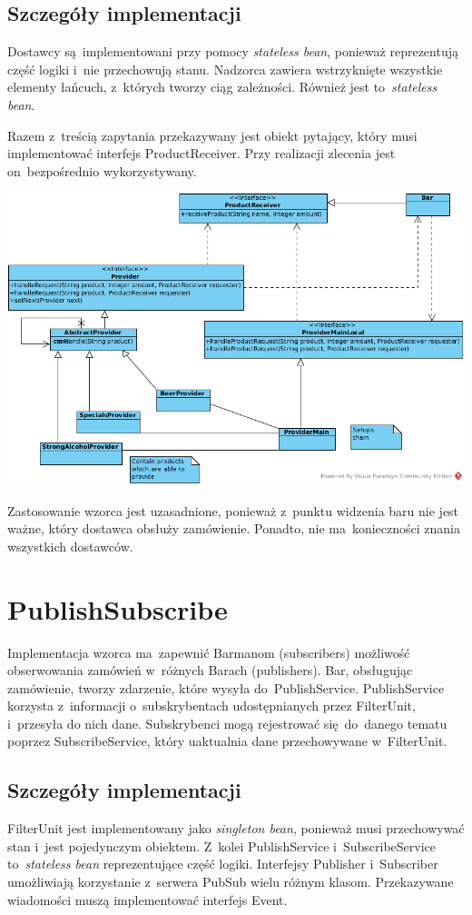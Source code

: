 \documentclass[11pt]{aghdpl}
\begin{document}
\subsection{Szczegóły implementacji}
Dostawcy są~implementowani przy pomocy \textit{stateless bean}, ponieważ reprezentują część logiki i~nie przechowują stanu. Nadzorca zawiera wstrzyknięte wszystkie elementy łańcuch, z~których tworzy ciąg zależności. Również jest to~\textit{stateless bean}.

Razem z~treścią zapytania przekazywany jest obiekt pytający, który musi implementować interfejs ProductReceiver. Przy realizacji zlecenia jest on~bezpośrednio wykorzystywany.
\begin{center}
 \includegraphics[width=16cm]{chain}
\end{center}

Zastosowanie wzorca jest uzasadnione, ponieważ z~punktu widzenia baru nie jest ważne, który dostawca obsłuży zamówienie. Ponadto, nie ma~konieczności znania wszystkich dostawców.

\section{PublishSubscribe}
Implementacja wzorca ma~zapewnić Barmanom (subscribers) możliwość obserwowania zamówień w~różnych Barach (publishers). Bar, obsługując zamówienie, tworzy zdarzenie, które wysyła do~PublishService. PublishService korzysta z~informacji o~subskrybentach udostępnianych przez FilterUnit, i~przesyła do nich dane. Subskrybenci mogą rejestrować się~do~danego tematu poprzez SubscribeService, który uaktualnia dane przechowywane w~FilterUnit.

\subsection{Szczegóły implementacji}
FilterUnit jest implementowany jako \textit{singleton bean}, ponieważ musi przechowywać stan i~jest pojedynczym obiektem. Z~kolei PublishService i~SubscribeService to~\textit{stateless bean} reprezentujące część logiki. Interfejsy Publisher i~Subscriber umożliwiają korzystanie z~serwera PubSub wielu różnym klasom. Przekazywane wiadomości muszą implementować interfejs Event.
\end{document}
